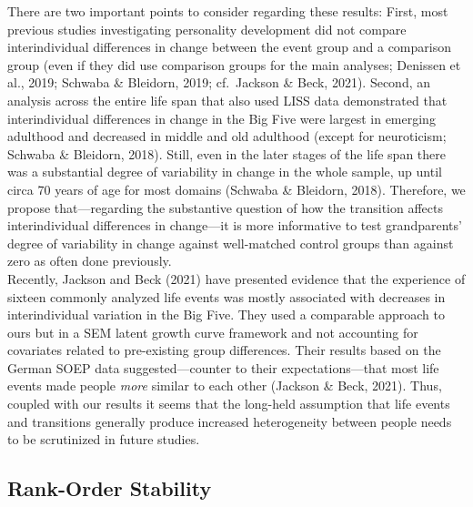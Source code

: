\documentclass[
  english,
  man, noextraspace]{apa7}
\begin{document}
There are two important points to consider regarding these results: First, most previous studies investigating personality development did not compare interindividual differences in change between the event group and a comparison group (even if they did use comparison groups for the main analyses; Denissen et al., 2019; Schwaba \& Bleidorn, 2019; cf.~Jackson \& Beck, 2021). Second, an analysis across the entire life span that also used LISS data demonstrated that interindividual differences in change in the Big Five were largest in emerging adulthood and decreased in middle and old adulthood (except for neuroticism; Schwaba \& Bleidorn, 2018). Still, even in the later stages of the life span there was a substantial degree of variability in change in the whole sample, up until circa 70 years of age for most domains (Schwaba \& Bleidorn, 2018). Therefore, we propose that---regarding the substantive question of how the transition affects interindividual differences in change---it is more informative to test grandparents' degree of variability in change against well-matched control groups than against zero as often done previously.\\
Recently, Jackson and Beck (2021) have presented evidence that the experience of sixteen commonly analyzed life events was mostly associated with decreases in interindividual variation in the Big Five. They used a comparable approach to ours but in a SEM latent growth curve framework and not accounting for covariates related to pre-existing group differences. Their results based on the German SOEP data suggested---counter to their expectations---that most life events made people \emph{more} similar to each other (Jackson \& Beck, 2021). Thus, coupled with our results it seems that the long-held assumption that life events and transitions generally produce increased heterogeneity between people needs to be scrutinized in future studies.

\hypertarget{rank-order-stability-1}{%
\subsection{Rank-Order Stability}\label{rank-order-stability-1}}
\end{document}
